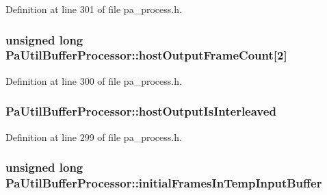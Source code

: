 Definition at line 301 of file pa\+\_\+process.\+h.

\subsubsection[{\texorpdfstring{host\+Output\+Frame\+Count}{hostOutputFrameCount}}]{\setlength{\rightskip}{0pt plus 5cm}unsigned long Pa\+Util\+Buffer\+Processor\+::host\+Output\+Frame\+Count\mbox{[}2\mbox{]}}\hypertarget{struct_pa_util_buffer_processor_ac5e048842fdfdee1764ab049a1306cfe}{}\label{struct_pa_util_buffer_processor_ac5e048842fdfdee1764ab049a1306cfe}


Definition at line 300 of file pa\+\_\+process.\+h.

\subsubsection[{\texorpdfstring{host\+Output\+Is\+Interleaved}{hostOutputIsInterleaved}}]{ Pa\+Util\+Buffer\+Processor\+::host\+Output\+Is\+Interleaved}\hypertarget{struct_pa_util_buffer_processor_a3be5c10e3f9e36326103443929547e25}{}\label{struct_pa_util_buffer_processor_a3be5c10e3f9e36326103443929547e25}


Definition at line 299 of file pa\+\_\+process.\+h.

\subsubsection[{\texorpdfstring{initial\+Frames\+In\+Temp\+Input\+Buffer}{initialFramesInTempInputBuffer}}]{\setlength{\rightskip}{0pt plus 5cm}unsigned long Pa\+Util\+Buffer\+Processor\+::initial\+Frames\+In\+Temp\+Input\+Buffer}\hypertarget{struct_pa_util_buffer_processor_a4deddc94ba71c17171e8ae823b89e832}{}\label{struct_pa_util_buffer_processor_a4deddc94ba71c17171e8ae823b89e832}


